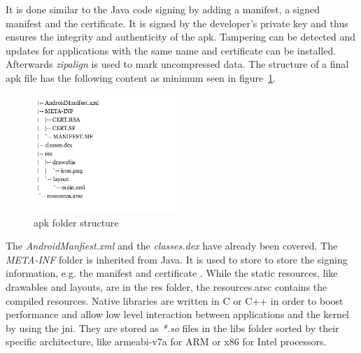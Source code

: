 It is done similar to the Java code signing \cite{codeSigning} by adding a manifest, a signed manifest and the certificate.
It is signed by the developer’s private key and thus ensures the integrity and authenticity of the \gls{apk}.
Tampering can be detected and updates for applications with the same name and certificate can be installed.
Afterwards \textit{zipalign} is used to mark uncompressed data. \cite{androidPublishSign} \cite{androidSigning} \cite{andevconDalvikART}
\newline
\newline
The structure of a final \gls{apk} file has the following content as minimum seen in figure~\ref{fig:apkfolder}.
\begin{figure}[h]
    \centering
    \includegraphics[width=0.5\textwidth]{data/apkfolder.png}
    \caption{\gls{apk} folder structure}
    \label{fig:apkfolder}
\end{figure}
The \textit{AndroidManfiest.xml} and the \textit{classes.dex} have already been covered.
\newline
The \textit{META-INF} folder is inherited from Java. It is used to store to store the signing information, e.g. the manifest and certificate \cite{codeSigning} \cite{metaJava}.
\newline
While the static resources, like drawables and layouts, are in the res folder, the resources.arsc contains the compiled resources.
\newline
Native libraries are written in C or C++ in order to boost performance and allow low level interaction between applications and the kernel by using the \gls{jni}.
They are stored as \textit{*.so} files in the libs folder sorted by their specific architecture, like armeabi-v7a for ARM or x86 for Intel processors.
\cite{kovachevaMaster} \cite{ehringerDalvik}
